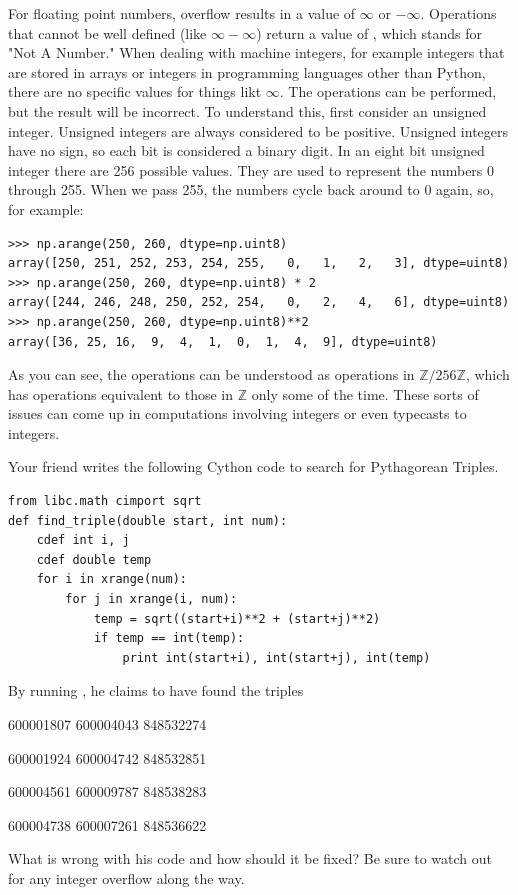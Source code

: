 For floating point numbers, overflow results in a value of $\infty$ or $-\infty$.
Operations that cannot be well defined (like $\infty - \infty$) return a value of , which stands for "Not A Number."
When dealing with machine integers, for example integers that are stored in arrays or integers in programming languages other than Python, there are no specific values for things likt $\infty$.
The operations can be performed, but the result will be incorrect.
To understand this, first consider an unsigned integer.
Unsigned integers are always considered to be positive.
Unsigned integers have no sign, so each bit is considered a binary digit.
In an eight bit unsigned integer there are 256 possible values.
They are used to represent the numbers 0 through 255.
When we pass 255, the numbers cycle back around to 0 again, so, for example:
\begin{lstlisting}
>>> np.arange(250, 260, dtype=np.uint8)
array([250, 251, 252, 253, 254, 255,   0,   1,   2,   3], dtype=uint8)
>>> np.arange(250, 260, dtype=np.uint8) * 2
array([244, 246, 248, 250, 252, 254,   0,   2,   4,   6], dtype=uint8)
>>> np.arange(250, 260, dtype=np.uint8)**2
array([36, 25, 16,  9,  4,  1,  0,  1,  4,  9], dtype=uint8)
\end{lstlisting}
As you can see, the operations can be understood as operations in $\mathbb{Z} / 256 \mathbb{Z}$, which has operations equivalent to those in $\mathbb{Z}$ only some of the time.
These sorts of issues can come up in computations involving integers or even typecasts to integers.

\begin{problem}
Your friend writes the following Cython code to search for Pythagorean Triples.
\begin{lstlisting}
from libc.math cimport sqrt
def find_triple(double start, int num):
    cdef int i, j
    cdef double temp
    for i in xrange(num):
        for j in xrange(i, num):
            temp = sqrt((start+i)**2 + (start+j)**2)
            if temp == int(temp):
                print int(start+i), int(start+j), int(temp)
\end{lstlisting}
By running , he claims to have found the triples

600001807  600004043  848532274

600001924  600004742  848532851

600004561  600009787  848538283

600004738  600007261  848536622

{\setlength{\parindent}{0cm}
What is wrong with his code and how should it be fixed?
Be sure to watch out for any integer overflow along the way.
}
\end{problem}

